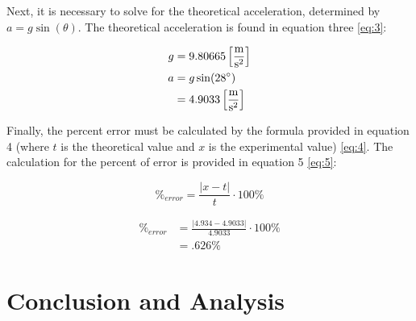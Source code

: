 \documentclass{article}
\begin{document}
\begin{justify}

Next, it is necessary to solve for the theoretical acceleration, determined by $a=g\sin(\theta)$. The theoretical acceleration is found in equation three \eqref{eq:3}:

\end{justify}

\begin{equation}
  \begin{split}
    g & = 9.80665\left[ \frac{\si{\meter}}{\si{\second\squared}} \right]\\
    a & = g\sin(28\degree) \\
    & = 4.9033\left[ \frac{\si{\meter}}{\si{\second\squared}} \right]
  \end{split}
  \label{eq:3}
\end{equation}

\begin{justify}

  Finally, the percent error must be calculated by the formula provided in equation 4 (where $t$ is the theoretical value and $x$ is the experimental value) \eqref{eq:4}. The calculation for the percent of error is provided in equation 5 \eqref{eq:5}:

\end{justify}

\begin{equation}
  \%_{error}=\frac{|x-t|}{t}\cdot 100\%
  \label{eq:4}
\end{equation}

\begin{equation}
  \begin{split}
    \%_{error} & = \frac{|4.934-4.9033|}{4.9033}\cdot 100\% \\
    & = .626\%
  \end{split}
  \label{eq:5}
\end{equation}

\section{Conclusion and Analysis}
\end{document}
